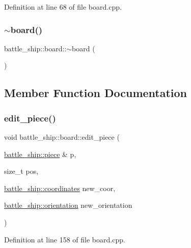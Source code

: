 Definition at line 68 of file board.\+cpp.

\mbox{\label{classbattle__ship_1_1board_a06d4ef9b5cb2dbb7aa4516464ff1ec52}} 
\subsubsection{\texorpdfstring{$\sim$board()}{~board()}}
{\footnotesize\ttfamily battle\+\_\+ship\+::board\+::$\sim$board (\begin{DoxyParamCaption}{ }\end{DoxyParamCaption})\hspace{0.3cm}{\ttfamily [default]}}



\subsection{Member Function Documentation}
\mbox{\label{classbattle__ship_1_1board_ab6dad94144c5142f3b956a78c6810a24}} 
\subsubsection{\texorpdfstring{edit\+\_\+piece()}{edit\_piece()}}
{\footnotesize\ttfamily void battle\+\_\+ship\+::board\+::edit\+\_\+piece (\begin{DoxyParamCaption}\item[{\hyperlink{classbattle__ship_1_1piece}{battle\+\_\+ship\+::piece} \&}]{p,  }\item[{size\+\_\+t}]{pos,  }\item[{\hyperlink{structbattle__ship_1_1coordinates}{battle\+\_\+ship\+::coordinates}}]{new\+\_\+coor,  }\item[{\hyperlink{namespacebattle__ship_aed87488f0a73f0d0679fe343fb61c784}{battle\+\_\+ship\+::orientation}}]{new\+\_\+orientation }\end{DoxyParamCaption})}



Definition at line 158 of file board.\+cpp.

